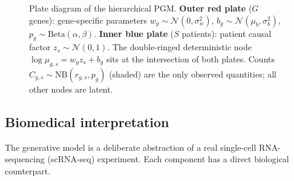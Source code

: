 \documentclass[11pt,a4paper]{article}
\theoremstyle{definition}
\begin{document}
\begin{figure}[ht]
\caption{%
  Plate diagram of the hierarchical PGM.
  \textbf{Outer red plate} ($G$ genes): gene-specific parameters
  $w_g \sim \mathcal{N}(0,\sigma_w^2)$,
  $b_g \sim \mathcal{N}(\mu_b, \sigma_b^2)$,
  $p_g \sim \mathrm{Beta}(\alpha,\beta)$.
  \textbf{Inner blue plate} ($S$ patients): patient causal factor
  $z_s \sim \mathcal{N}(0,1)$.
  The double-ringed deterministic node $\log\mu_{g,s} = w_g z_s + b_g$
  sits at the intersection of both plates.
  Counts $C_{g,s} \sim \mathrm{NB}(r_{g,s}, p_g)$ (shaded) are the
  only observed quantities; all other nodes are latent.
}
\label{fig:pgm}
\end{figure}

\subsection{Biomedical interpretation}
\label{sec:biomedical}

The generative model is a deliberate abstraction of a real single-cell
RNA-sequencing (scRNA-seq) experiment.  Each component has a direct
biological counterpart.
\end{document}
